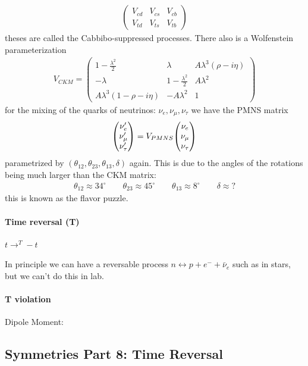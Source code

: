 \documentclass[../main.tex]{subfiles}
\begin{document}
\begin{itemize}
\begin{align*}
\begin{pmatrix}
            V_{cd} & V_{cs} & V_{cb} \\
            V_{td} & V_{ts} & V_{tb}
        \end{pmatrix}
    \end{align*}
    theses are called the Cabbibo-suppressed processes. There also is a Wolfenstein parameterization
    \begin{align*}
        V_{CKM} = \begin{pmatrix}
            1 - \frac{\lambda^2}{2} & \lambda & A\lambda^3(\rho - i\eta) \\
            -\lambda & 1 - \frac{\lambda^2}{2} & A\lambda^2 \\
            A\lambda^3(1 - \rho - i\eta) & -A\lambda^2 & 1
        \end{pmatrix}
    \end{align*}
    for the mixing of the quarks of neutrinos: $\nu_e, \nu_\mu, \nu_\tau$ we have the PMNS matrix
    \begin{align*}
        \mqty(\nu_e' \\ \nu_\mu' \\ \nu_\tau') = V_{PMNS} \mqty(\nu_e \\ \nu_\mu \\ \nu_\tau)
    \end{align*}
    parametrized by $(\theta_{12}, \theta_{23}, \theta_{13}, \delta)$ again. This is due to the 
    angles of the rotations being much larger than the CKM matrix:
    \begin{align*}
        \theta_{12} \approx 34^\circ \qquad \theta_{23} \approx 45^\circ \qquad \theta_{13} \approx
        8^\circ \qquad \delta \approx ?
    \end{align*}
    this is known as the flavor puzzle.
\end{itemize}

\paragraph*{Time reversal (T)} $t \to^T -t$

In principle we can have a reversable process $n \leftrightarrow p + e^- + \bar \nu_e$ such as in 
stars, but we can't do this in lab. 

\paragraph*{T violation} Dipole Moment:

\newpage
{}
\subsection*{Symmetries Part 8: Time Reversal}
\end{document}
